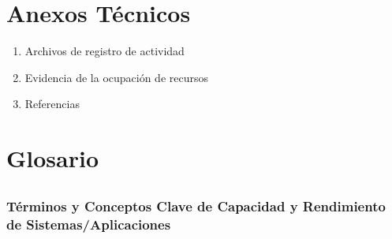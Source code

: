 \documentclass[
  paper=a4,
  ,captions=tableheading
]{scrartcl}
\providecommand{\tightlist}{%
  \setlength{\itemsep}{0pt}\setlength{\parskip}{0pt}}
\renewenvironment{quote}{\begin{customblockquote}\list{}{\rightmargin=0em\leftmargin=0em}%
\item\relax\color{blockquote-text}\ignorespaces}{\unskip\unskip\endlist\end{customblockquote}}
\begin{document}
\newpage

\section{Anexos Técnicos}\label{sec:anexos-tuxe9cnicos}

\begin{enumerate}
\def\labelenumi{\arabic{enumi}.}
\tightlist
\item
  Archivos de registro de actividad
\item
  Evidencia de la ocupación de recursos
\item
  Referencias
\end{enumerate}

\newpage

\section{Glosario}\label{sec:glosario}

\subsection{}\label{sec:section}

\begin{quote}
\end{quote}

\subsubsection{Términos y Conceptos Clave de Capacidad y Rendimiento de
Sistemas/Aplicaciones}\label{sec:tuxe9rminos-y-conceptos-clave-de-capacidad-y-rendimiento-de-sistemasaplicaciones}
\end{document}
